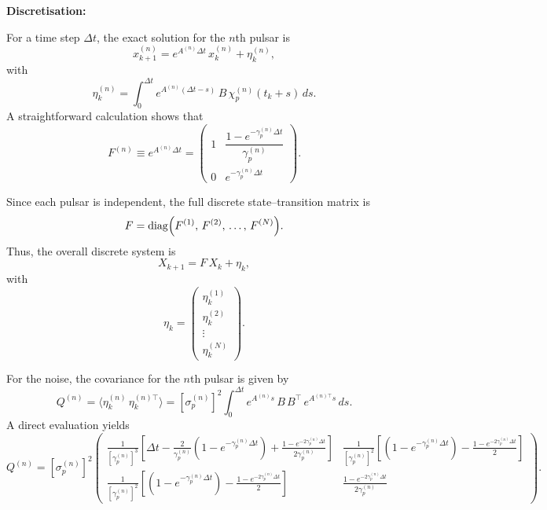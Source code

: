 \documentclass{tufte-handout} %
\begin{document}
\bigskip
\textbf{Discretisation:}

For a time step $\Delta t$, the exact solution for the $n$th pulsar is
\begin{equation}
x_{k+1}^{(n)} = e^{A^{(n)}\Delta t}\,x_k^{(n)} + \eta_k^{(n)},
\end{equation}
with
\begin{equation}
\eta_k^{(n)} = \int_0^{\Delta t} e^{A^{(n)}(\Delta t-s)}\,B\,\chi_p^{(n)}(t_k+s)\,ds.
\end{equation}
A straightforward calculation shows that
\begin{equation}
F^{(n)} \equiv e^{A^{(n)}\Delta t} =
\begin{pmatrix}
1 & \dfrac{1-e^{-\gamma_p^{(n)}\Delta t}}{\gamma_p^{(n)}} \\[1mm]
0 & e^{-\gamma_p^{(n)}\Delta t}
\end{pmatrix}.
\end{equation}

Since each pulsar is independent, the full discrete state--transition matrix is
\begin{equation}
F = \operatorname{diag}\Bigl(F^{(1)},\,F^{(2)},\,\ldots,\,F^{(N)}\Bigr).
\end{equation}
Thus, the overall discrete system is
\begin{equation}
X_{k+1} = F\,X_k + \eta_k,
\end{equation}
with
\begin{equation}
\eta_k = \begin{pmatrix} \eta_k^{(1)} \\[1mm] \eta_k^{(2)} \\[1mm] \vdots \\[1mm] \eta_k^{(N)} \end{pmatrix}.
\end{equation}

For the noise, the covariance for the $n$th pulsar is given by
\begin{equation}
Q^{(n)} = \langle \eta_k^{(n)}\,\eta_k^{(n)\top} \rangle = \left[\sigma_p^{(n)}\right]^2 \int_0^{\Delta t} e^{A^{(n)}s}\,B\,B^\top\,e^{A^{(n)\top}s}\,ds.
\end{equation}
A direct evaluation yields
\begin{equation}
Q^{(n)} = \left[\sigma_p^{(n)}\right]^2 
\begin{pmatrix}
\displaystyle \frac{1}{\left[\gamma_p^{(n)}\right]^3}\left[\Delta t-\frac{2}{\gamma_p^{(n)}}
\left(1-e^{-\gamma_p^{(n)}\Delta t}\right)+\frac{1-e^{-2\gamma_p^{(n)}\Delta t}}{2\gamma_p^{(n)}}\right] & \displaystyle \frac{1}{\left[\gamma_p^{(n)}\right]^2}\left[\left(1-e^{-\gamma_p^{(n)}\Delta t}\right)-\frac{1-e^{-2\gamma_p^{(n)}\Delta t}}{2}\right] \\[2mm]
\displaystyle \frac{1}{\left[\gamma_p^{(n)}\right]^2}\left[\left(1-e^{-\gamma_p^{(n)}\Delta t}\right)-\frac{1-e^{-2\gamma_p^{(n)}\Delta t}}{2}\right] & \displaystyle \frac{1-e^{-2\gamma_p^{(n)}\Delta t}}{2\gamma_p^{(n)}}
\end{pmatrix}.
\end{equation}
\end{document}
